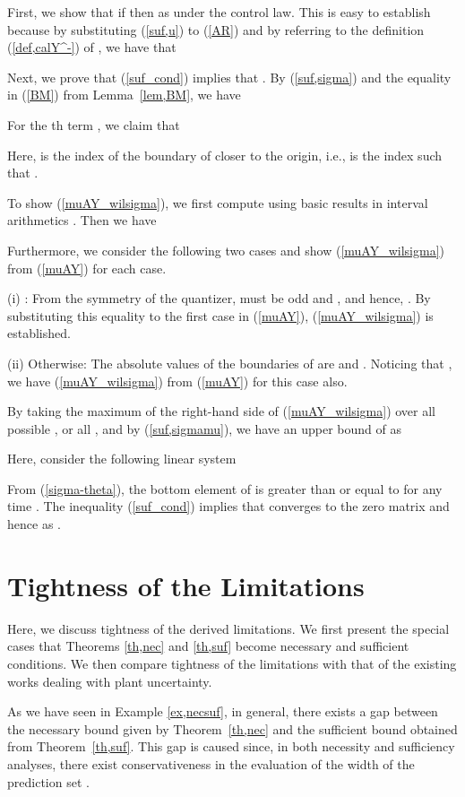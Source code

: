 \documentclass[a4paper, 11pt]{article}
\makeatletter
\theoremstyle{definition}
\newenvironment{pf}[1][\proofname]{\par\pushQED{\qed}
 \normalfont\topsep6\p@\@plus6\p@\relax\trivlist\item[\hskip\labelsep\bfseries#1\@addpunct{.}]
 \ignorespaces}{\popQED\endtrivlist\@endpefalse}
\makeatother
\begin{document}
\begin{pf}[Proof of Theorem~\ref{th,suf}]
First, we show that if  then  as 
under the control law.
This is easy to establish because by substituting (\ref{suf,u}) to (\ref{AR})
and by referring to the definition (\ref{def,calY^-}) of ,
we have that


Next, we prove that (\ref{suf_cond}) implies that .
By (\ref{suf,sigma}) and the equality in (\ref{BM}) from Lemma~\ref{lem,BM},
we have

For the th term , we claim that

Here,  is the index of the boundary of  closer
to the origin, i.e.,  is the index such that
.

To show (\ref{muAY_wilsigma}), we first compute 
using basic results in interval arithmetics \cite{Moore1966}.
Then we have

Furthermore, we consider the following two cases and show (\ref{muAY_wilsigma})
from (\ref{muAY}) for each case.

(i) :
From the symmetry of the quantizer,  must be odd and ,
and hence, .
By substituting this equality to the first case in (\ref{muAY}),
(\ref{muAY_wilsigma}) is established.

(ii) Otherwise:
The absolute values of the boundaries of 
are  and .
Noticing that , we have (\ref{muAY_wilsigma})
from (\ref{muAY}) for this case also.


By taking the maximum of the right-hand side of (\ref{muAY_wilsigma}) over
all possible , or all ,
and by (\ref{suf,sigmamu}), we have an upper bound of  as

Here, consider the following linear system

From (\ref{sigma-theta}), the bottom element of  is greater
than or equal to  for any time .
The inequality (\ref{suf_cond}) implies that  converges to the zero
matrix and hence  as .
\end{pf}


\section{Tightness of the Limitations}\label{sec,scalar}
Here, we discuss tightness of the derived limitations.
We first present the special cases that Theorems \ref{th,nec} and
\ref{th,suf} become necessary and sufficient conditions.
We then compare tightness of the limitations with that of the existing
works dealing with plant uncertainty.


As we have seen in Example \ref{ex,necsuf}, in general, there exists a gap between
the necessary bound given by Theorem~\ref{th,nec} and the
sufficient bound obtained from Theorem~\ref{th,suf}.
This gap is caused since, in both necessity and sufficiency analyses,
there exist conservativeness in the evaluation of the width of the prediction
set .
\end{document}
